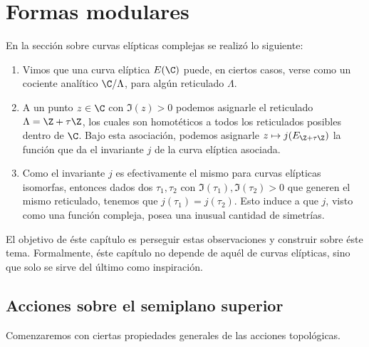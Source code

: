 \documentclass[teoria-numeros.tex]{subfiles}
\begin{document}
\chapter{Formas modulares}
En la sección sobre curvas elípticas complejas se realizó lo siguiente:
\begin{enumerate}
	\item Vimos que una curva elíptica $E(\C)$ puede, en ciertos casos, verse como un cociente analítico $\C/\Lambda$,
		para algún reticulado $\Lambda$.
	\item A un punto $z \in \C$ con $\Im(z) > 0$ podemos asignarle el reticulado $\Lambda = \Z + \tau\Z$, los cuales son homotéticos a todos los reticulados
		posibles dentro de $\C$.
		Bajo esta asociación, podemos asignarle $z \mapsto j(E_{\Z + \tau\Z})$ la función que da el invariante $j$ de la curva elíptica asociada.
	\item Como el invariante $j$ es efectivamente el mismo para curvas elípticas isomorfas,
		entonces dados dos $\tau_1, \tau_2$ con $\Im(\tau_1), \Im(\tau_2) > 0$ que generen el mismo reticulado, tenemos que $j(\tau_1) = j(\tau_2)$.
		Esto induce a que $j$, visto como una función compleja, posea una inusual cantidad de simetrías.
\end{enumerate}
El objetivo de éste capítulo es perseguir estas observaciones y construir sobre éste tema.
Formalmente, éste capítulo no depende de aquél de curvas elípticas, sino que solo se sirve del último como inspiración.

\section{Acciones sobre el semiplano superior}
Comenzaremos con ciertas propiedades generales de las acciones topo\-lógicas.
\nocite{miyake:modular}
\end{document}
